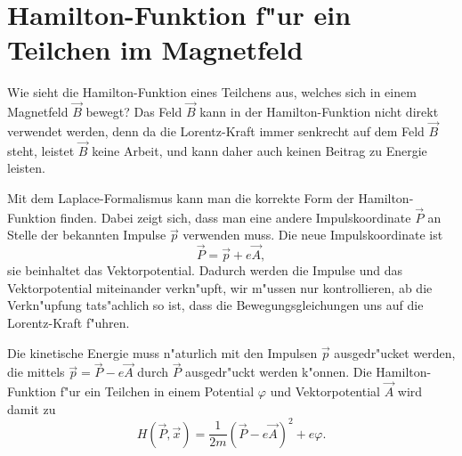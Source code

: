 \section{Hamilton-Funktion f"ur ein Teilchen im Magnetfeld\label{section:hamilton-funktion-im-magnetfeld}}
Wie sieht die Hamilton-Funktion eines Teilchens aus, welches  sich in
einem Magnetfeld $\vec B$ bewegt?
Das Feld $\vec B$ kann in der Hamilton-Funktion nicht direkt
verwendet werden, denn da die Lorentz-Kraft immer senkrecht
auf dem Feld $\vec B$ steht, leistet $\vec B$ keine Arbeit, und kann
daher auch keinen Beitrag zu Energie leisten.

Mit dem Laplace-Formalismus kann man die korrekte Form der
Hamilton-Funktion finden.
Dabei zeigt sich, dass man eine andere Impulskoordinate $\vec P$
an Stelle der bekannten Impulse $\vec p$ verwenden muss. 
Die neue Impulskoordinate ist 
\[
\vec P = \vec p + e\vec A,
\]
sie beinhaltet das Vektorpotential.
Dadurch werden die Impulse und das Vektorpotential miteinander 
verkn"upft, wir m"ussen nur kontrollieren, ab die Verkn"upfung
tats"achlich so ist, dass die Bewegungsgleichungen uns auf die
Lorentz-Kraft f"uhren.

Die kinetische Energie muss n"aturlich mit den Impulsen $\vec p$ ausgedr"ucket
werden, die mittels $\vec p=\vec P-e\vec A$ durch $\vec P$
ausgedr"uckt werden k"onnen.
Die Hamilton-Funktion f"ur ein Teilchen in einem Potential $\varphi$
und Vektorpotential $\vec A$ wird damit zu
\begin{equation}
H(\vec P, \vec x)=\frac1{2m}(\vec P-e\vec A)^2+e\varphi.
\label{skript:hamiltonmitmagnetfeld}
\end{equation}

